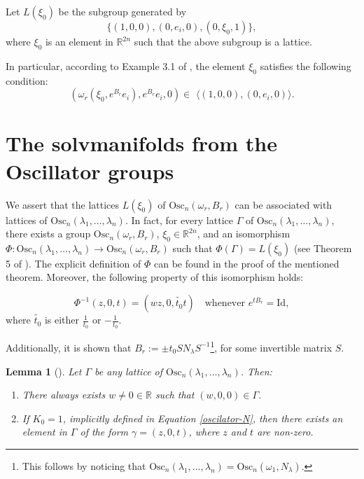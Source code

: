 \documentclass[12pt]{amsart}
\theoremstyle{plain}
\newtheorem{lem}[thm]{Lemma}
\theoremstyle{definition}
\theoremstyle{remark}
\begin{document}
Let \( L(\xi_0) \) be the subgroup generated by 
\[
\{ (1,0,0), (0,e_i,0), (0,\xi_0,1) \},
\]
where \( \xi_0 \) is an element in \( \mathbb{R}^{2n} \) such that the above subgroup is a lattice.

In particular, according to Example 3.1 of \cite{MF}, the element \( \xi_0 \) satisfies the following condition:
\begin{equation}\label{xi-condition}
    (\omega_r(\xi_0, e^{B_r}e_i), e^{B_r} e_i, 0) \in \,\, \langle (1,0,0), (0,e_i,0) \rangle.
\end{equation}

	
	
\section{The solvmanifolds from the Oscillator groups}\label{sectionosc}

We assert that the lattices \( L(\xi_0) \) of \( \text{Osc}_n(\omega_r, B_r) \) can be associated with lattices of \( \text{Osc}_n(\lambda_1, \ldots, \lambda_n) \). In fact, for every lattice \( \Gamma \) of \( \text{Osc}_n(\lambda_1, \ldots, \lambda_n) \), there exists a group \( \text{Osc}_n(\omega_r, B_r) \), \( \xi_0 \in \mathbb{R}^{2n} \), and an isomorphism \( \Phi: \text{Osc}_n(\lambda_1, \ldots, \lambda_n) \rightarrow \text{Osc}_n(\omega_r, B_r) \) such that \( \Phi(\Gamma) = L(\xi_0) \) (see Theorem 5 of \cite{MF}). The explicit definition of \( \Phi \) can be found in the proof of the mentioned theorem. Moreover, the following property of this isomorphism holds:

\begin{equation} \label{condition-exp}
    \Phi^{-1}(z,0,t) = (w z, 0, \widetilde{t_0} t) \quad \text{whenever } e^{t B_r} = \text{Id},
\end{equation}
where \( \widetilde{t_0} \) is either \( \frac{1}{t_0} \) or \( -\frac{1}{t_0} \).

Additionally, it is shown that \( B_r := \pm t_0 S N_{\lambda} S^{-1} \)\footnote{This follows by noticing that \( \text{Osc}_n(\lambda_1, \ldots, \lambda_n) = \text{Osc}_n(\omega_1, N_{\lambda}) \).}, for some invertible matrix \( S \).

\begin{lem}[\cite{MF}]\label{oscilador-elementos}
    Let \( \Gamma \) be any lattice of \( \text{Osc}_n(\lambda_1, \ldots, \lambda_n) \). Then:
    \begin{enumerate}
        \item There always exists \( w \neq 0 \in \mathbb{R} \) such that \( (w, 0, 0) \in \Gamma \).
        \item If \( K_0 = 1 \), implicitly defined in Equation \eqref{oscilator-N}, then there exists an element in \( \Gamma \) of the form \( \gamma = (z, 0, t) \), where \( z \) and \( t \) are non-zero.
    \end{enumerate}
\end{lem}
\end{document}

